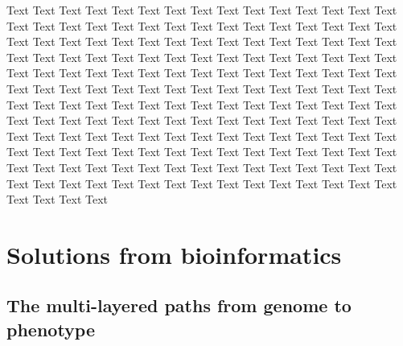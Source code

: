 \documentclass{bioinfo}
\begin{document}
Text Text Text Text Text Text  Text Text Text Text Text Text Text Text  Text Text Text Text Text Text Text Text  Text Text Text Text Text Text Text Text  Text Text Text Text Text Text Text Text  Text Text Text Text Text Text Text Text  Text Text Text Text Text Text Text Text  Text Text Text Text Text Text Text Text  Text Text Text Text Text Text Text Text  Text Text Text Text Text Text Text Text  Text Text Text Text Text Text Text Text  Text Text Text Text Text Text Text Text  Text Text Text Text Text Text Text Text  Text Text Text Text Text Text Text Text  Text Text Text Text Text Text Text Text  Text Text Text Text Text Text Text Text  Text Text Text Text Text Text Text Text  Text Text Text Text Text Text Text Text  Text Text Text Text Text Text Text Text  Text Text Text Text Text Text Text Text  Text Text Text Text Text Text Text Text  Text Text Text Text Text Text Text Text  Text Text Text Text Text Text Text Text  Text Text 
%
\section{Solutions from bioinformatics}
\subsection{The multi-layered paths from genome to phenotype}
\end{document}
